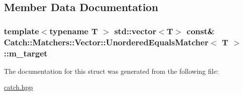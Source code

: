 \subsection{Member Data Documentation}
\hypertarget{struct_catch_1_1_matchers_1_1_vector_1_1_unordered_equals_matcher_aaa39871eb4034d4335214215dd693712}{
\subsubsection[{m\-\_\-target}]{\setlength{\rightskip}{0pt plus 5cm}template$<$typename T $>$ std\-::vector$<$T$>$ const\& {\bf Catch\-::\-Matchers\-::\-Vector\-::\-Unordered\-Equals\-Matcher}$<$ T $>$\-::m\-\_\-target\hspace{0.3cm}{\ttfamily [private]}}}\label{struct_catch_1_1_matchers_1_1_vector_1_1_unordered_equals_matcher_aaa39871eb4034d4335214215dd693712}


The documentation for this struct was generated from the following file\-:\begin{DoxyCompactItemize}
\item 
\hyperlink{catch_8hpp}{catch.\-hpp}\end{DoxyCompactItemize}
